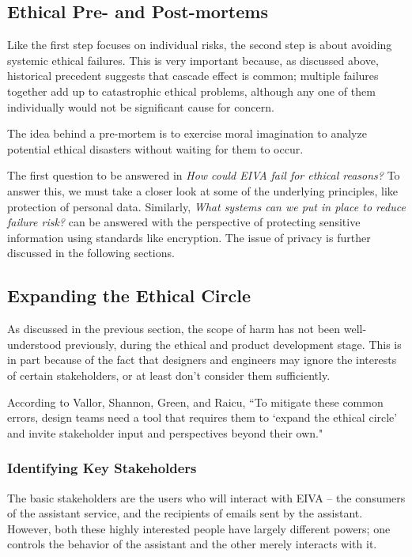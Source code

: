 \documentclass{article}
\begin{document}
\subsection{Ethical Pre- and Post-mortems}

Like the first step focuses on individual risks, the second step is about avoiding systemic ethical failures. This is very important because, as discussed above, historical precedent suggests that cascade effect is common; multiple failures together add up to catastrophic ethical problems, although any one of them individually would not be significant cause for concern.

The idea behind a pre-mortem is to exercise moral imagination to analyze potential ethical disasters without waiting for them to occur.

The first question to be answered in \emph{How could EIVA fail for ethical reasons?} To answer this, we must take a closer look at some of the underlying principles, like protection of personal data. Similarly, \emph{What systems can we put in place to reduce failure risk?} can be answered with the perspective of protecting sensitive information using standards like encryption. The issue of privacy is further discussed in the following sections.

\subsection{Expanding the Ethical Circle}

As discussed in the previous section, the scope of harm has not been well-understood previously, during the ethical and product development stage. This is in part because of the fact that designers and engineers may ignore the interests of certain stakeholders, or at least don't consider them sufficiently.

According to Vallor, Shannon, Green, and Raicu, ``To mitigate these common errors, design teams need a tool that requires them to ‘expand the ethical circle’ and invite stakeholder input and perspectives beyond their own."

\subsubsection{Identifying Key Stakeholders}

The basic stakeholders are the users who will interact with EIVA -- the consumers of the assistant service, and the recipients of emails sent by the assistant. However, both these highly interested people have largely different powers; one controls the behavior of the assistant and the other merely interacts with it.
\end{document}
